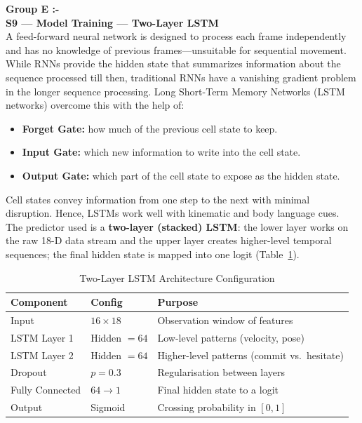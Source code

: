 \documentclass[conference]{IEEEtran}
\begin{document}
\vspace{8pt}
\noindent\textbf{Group E :- }
\mbox{}\\
\textbf{S9 --- Model Training --- Two-Layer LSTM} \\
A feed-forward neural network is designed to process each frame independently and has no knowledge of previous frames---unsuitable for sequential movement. While RNNs provide the hidden state that summarizes information about the sequence processed till then, traditional RNNs have a vanishing gradient problem in the longer sequence processing. Long Short-Term Memory Networks (LSTM networks) overcome this with the help of:
\begin{itemize}
    \item \textbf{Forget Gate:} how much of the previous cell state to keep.
    \item \textbf{Input Gate:} which new information to write into the cell state.
    \item \textbf{Output Gate:} which part of the cell state to expose as the hidden state.
\end{itemize}
Cell states convey information from one step to the next with minimal disruption. Hence, LSTMs work well with kinematic and body language cues. The predictor used is a \textbf{two-layer (stacked) LSTM}: the lower layer works on the raw 18-D data stream and the upper layer creates higher-level temporal sequences; the final hidden state is mapped into one logit (Table~\ref{tab:lstm}).
\begin{table}[H]
    \centering
    \small
    \setlength{\tabcolsep}{4pt}
    \renewcommand{\arraystretch}{1.1}
    \caption{Two-Layer LSTM Architecture Configuration}
    \label{tab:lstm}
    \begin{tabular}{|l|l|p{3.4cm}|}
        \hline
        \textbf{Component} & \textbf{Config} & \textbf{Purpose} \\ \hline
        Input & $16 \times 18$ & Observation window of features \\ \hline
        LSTM Layer 1 & Hidden $= 64$ & Low-level patterns (velocity, pose) \\ \hline
        LSTM Layer 2 & Hidden $= 64$ & Higher-level patterns (commit vs.\ hesitate) \\ \hline
        Dropout & $p = 0.3$ & Regularisation between layers \\ \hline
        Fully Connected & $64 \rightarrow 1$ & Final hidden state to a logit \\ \hline
        Output & Sigmoid & Crossing probability in $[0,1]$ \\ \hline
    \end{tabular}
\end{table}
\end{document}
